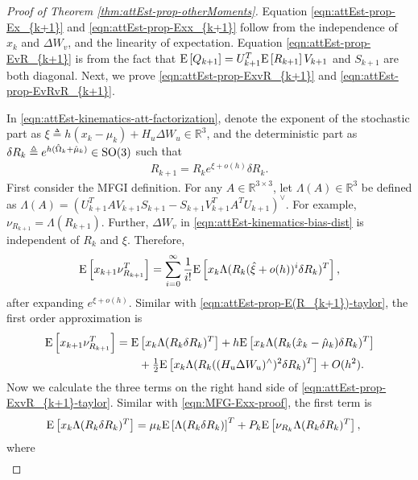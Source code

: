 \begin{proof}[Proof of Theorem \ref{thm:attEst-prop-otherMoments}]
	Equation \eqref{eqn:attEst-prop-Ex_{k+1}} and \eqref{eqn:attEst-prop-Exx_{k+1}} follow from the independence of $x_k$ and $\Delta W_v$, and the linearity of expectation.
	Equation \eqref{eqn:attEst-prop-EvR_{k+1}} is from the fact that $\mathrm{E}\left[ Q_{k+1} \right] = U_{k+1}^T\mathrm{E}\left[ R_{k+1} \right]V_{k+1}$ and $S_{k+1}$ are both diagonal.
	Next, we prove \eqref{eqn:attEst-prop-ExvR_{k+1}} and \eqref{eqn:attEst-prop-EvRvR_{k+1}}.
	
	In \eqref{eqn:attEst-kinematics-att-factorization}, denote the exponent of the stochastic part as $\xi \triangleq h(x_k-\mu_k) + H_u\Delta W_u\in\mathbb{R}^3$, and the deterministic part as $\delta R_k \triangleq e^{h(\hat{\Omega}_k+\hat{\mu}_k)}\in\mathrm{SO}(3)$ such that
	\begin{align*}
		R_{k+1} = R_k e^{\xi + o(h)} \delta R_k.
	\end{align*}
	First consider the MFGI definition.
	For any $A \in \mathbb{R}^{3\times 3}$, let $\Lambda(A)\in\mathbb{R}^3$ be defined as $\Lambda(A) = (U_{k+1}^TAV_{k+1}S_{k+1}-S_{k+1}V_{k+1}^TA^TU_{k+1})^\vee$. 
	For example, $\nu_{R_{k+1}} = \Lambda(R_{k+1})$.
	Further, $\Delta W_v$ in \eqref{eqn:attEst-kinematics-bias-dist} is independent of $R_k$ and $\xi$.
	Therefore, 
	\begin{align*}
		\mathrm{E}\left[ x_{k+1}\nu^T_{R_{k+1}} \right] = \sum_{i=0}^\infty \frac{1}{i!} \mathrm{E}\left[ x_k \Lambda (R_k(\hat{\xi}+o(h))^i \delta R_k)^T \right],
	\end{align*}
	after expanding $e^{\xi + o(h)}$. 
	Similar with \eqref{eqn:attEst-prop-E(R_{k+1})-taylor},  the first order approximation is 
	\begin{align} \label{eqn:attEst-prop-ExvR_{k+1}-taylor}
		\expect{x_{k+1}\nu^T_{R_{k+1}}} &= \expect{x_k \Lambda(R_k\delta R_k )^T} + h\expect{x_k \Lambda( R_k(\hat x_k-\hat{\mu}_k)\delta R_k )^T} \nonumber \\
		&\qquad + \tfrac{1}{2}\expect{x_k \Lambda( R_k((H_u\Delta W_u)^\wedge)^2\delta R_k )^T} + O(h^2).
	\end{align}
	Now we calculate the three terms on the right hand side of \eqref{eqn:attEst-prop-ExvR_{k+1}-taylor}.
	Similar with \eqref{eqn:MFG-Exx-proof}, the first term is
	\begin{align*}
		\mathrm{E}\left[ x_k\Lambda( R_k\delta R_k )^T \right] & = \mu_k\mathrm{E}\left[ \Lambda( R_k\delta R_k ) \right]^T + P_k \mathrm{E}\left[ \nu_{R_k} \Lambda(R_k\delta R_k)^T  \right],
	\end{align*}
	where
	\begin{align*}

\end{align*}
\end{proof}
